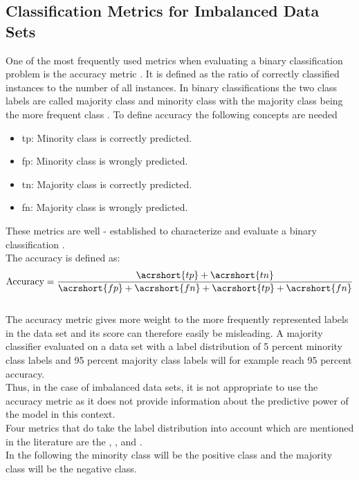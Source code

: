 \subsection{Classification Metrics for Imbalanced Data Sets}
\label{sec:metrics}
One of the most frequently used metrics when evaluating a binary classification problem is the accuracy metric \cite{tharwat2020classification}. It is defined as the ratio of correctly classified instances to the number of all instances. In binary classifications the two class labels are called majority class and minority class with the majority class being the more frequent class \cite{hossin2015review}. To define accuracy the following concepts are needed
\begin{itemize}
    \item \acrfull{tp}: Minority class is correctly predicted.
    \item \acrfull{fp}: Minority class is wrongly predicted.
    \item \acrfull{tn}: Majority class is correctly predicted.
    \item \acrfull{fn}: Majority class is wrongly predicted.
\end{itemize}
These metrics are well - established to characterize and evaluate a binary classification \cite{tharwat2020classification}. \\
The accuracy is defined as:
\begin{equation}
    \text{Accuracy} = \frac{\acrshort{tp} + \acrshort{tn}}{\acrshort{fp} + \acrshort{fn} + \acrshort{tp} + \acrshort{fn}}
\end{equation}\\
The accuracy metric gives more weight to the more frequently represented labels in the data set and its score can therefore easily be misleading. A majority classifier evaluated on a data set with a label distribution of 5 percent minority class labels and 95 percent majority class labels will for example reach 95 percent accuracy.\\
Thus, in the case of imbalanced data sets, it is not appropriate to use the accuracy metric as it does not provide information about the predictive power of the model in this context.\\
Four metrics that do take the label distribution into account which are mentioned in the literature are the , ,  and  \cite{he2009learning}.\\
In the following the minority class will be the positive class and the majority class will be the negative class.\\ 
